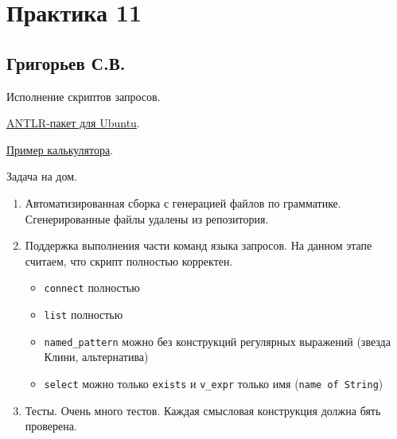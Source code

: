 \section{Практика 11}

\subsection{Григорьев С.В.}


Исполнение скриптов запросов.

\href{https://packages.ubuntu.com/search?keywords=antlr4}{ANTLR-пакет для Ubuntu}.

\href{https://github.com/shmatov/antlr4-calculator}{Пример калькулятора}.


Задача на дом.
\begin{enumerate}
  \item Автоматизированная сборка с генерацией файлов по грамматике. Сгенерированные файлы удалены из репозитория.
  \item Поддержка выполнения части команд языка запросов. На данном этапе считаем, что скрипт полностью корректен.
  \begin{itemize}
    \item \verb|connect| полностью
    \item \verb|list| полностью
    \item \verb|named_pattern| можно без конструкций регулярных выражений (звезда Клини, альтернатива)
    \item \verb|select| можно только \verb|exists| и \verb|v_expr| только имя (\verb|name of String|)
  \end{itemize}
  \item Тесты. Очень много тестов. Каждая смысловая конструкция должна бять проверена.

\end{enumerate}
